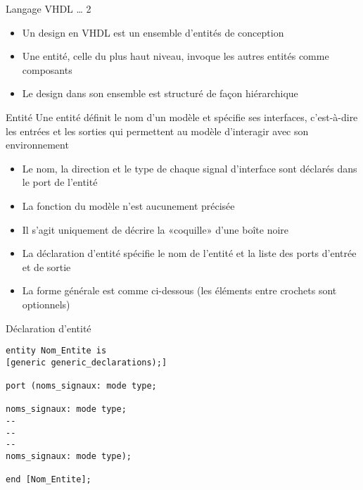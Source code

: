 \documentclass[presentation]{beamer}
\begin{document}
\begin{frame}[label={sec:org551c166}]{Langage VHDL \ldots{} 2}
\begin{itemize}
\item Un design en VHDL est un ensemble d'entités de conception
\item Une entité, celle du plus haut niveau, invoque les autres entités comme composants
\item Le design dans son ensemble est structuré de façon hiérarchique
\end{itemize}
\end{frame}

\begin{frame}[label={sec:org9179283}]{Entité}
Une \alert{entité} définit le nom d'un modèle et spécifie ses interfaces, c'est-à-dire les entrées et les sorties qui permettent au modèle d'interagir avec son environnement
\begin{itemize}
\item Le nom, la direction et le type de chaque signal d'interface sont déclarés dans le \alert{port} de l'entité
\item La fonction du modèle n'est aucunement précisée
\item Il s'agit uniquement de décrire la «coquille» d'une boîte noire
\item La déclaration d'entité spécifie le nom de l'entité et la liste des ports d'entrée et de sortie
\item La forme générale est comme ci-dessous (les éléments entre crochets sont optionnels)
\end{itemize}
\end{frame}

\begin{frame}[label={sec:orge18c3a5},fragile]{Déclaration d'entité}
 \begin{verbatim}
entity Nom_Entite is 
[generic generic_declarations);]

port (noms_signaux: mode type;

noms_signaux: mode type;
--
--
--
noms_signaux: mode type);

end [Nom_Entite];

\end{verbatim}
\end{frame}
\end{document}
